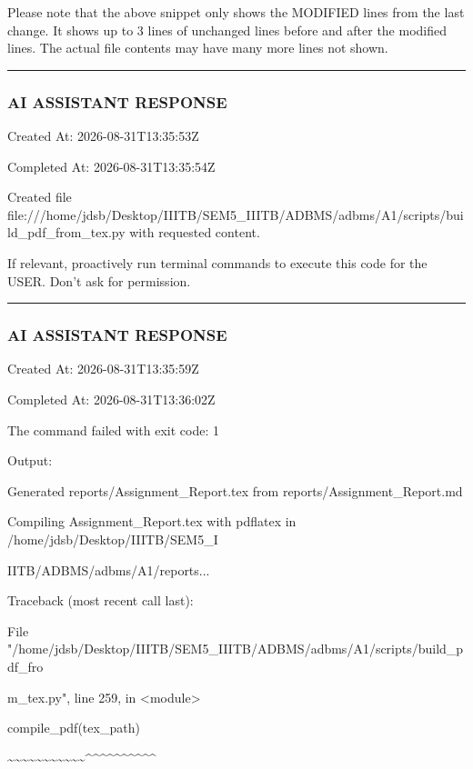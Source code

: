 \documentclass[11pt,a4paper]{article}
\begin{document}
{\begin{itemize}
\end{itemize}

Please note that the above snippet only shows the MODIFIED lines from the last change. It shows up to 3 lines of unchanged lines before and after the modified lines. The actual file contents may have many more lines not shown.


\hrule

\subsubsection{AI ASSISTANT RESPONSE}

Created At: 2026-08-31T13:35:53Z

Completed At: 2026-08-31T13:35:54Z

Created file file:///home/jdsb/Desktop/IIITB/SEM5\_IIITB/ADBMS/adbms/A1/scripts/build\_pdf\_from\_tex.py with requested content.

If relevant, proactively run terminal commands to execute this code for the USER. Don't ask for permission.


\hrule

\subsubsection{AI ASSISTANT RESPONSE}

Created At: 2026-08-31T13:35:59Z

Completed At: 2026-08-31T13:36:02Z


The command failed with exit code: 1

Output:

Generated reports/Assignment\_Report.tex from reports/Assignment\_Report.md

Compiling Assignment\_Report.tex with pdflatex in /home/jdsb/Desktop/IIITB/SEM5\_I

IITB/ADBMS/adbms/A1/reports...

Traceback (most recent call last):

File "/home/jdsb/Desktop/IIITB/SEM5\_IIITB/ADBMS/adbms/A1/scripts/build\_pdf\_fro

m\_tex.py", line 259, in <module>

compile\_pdf(tex\_path)

\textasciitilde{}\textasciitilde{}\textasciitilde{}\textasciitilde{}\textasciitilde{}\textasciitilde{}\textasciitilde{}\textasciitilde{}\textasciitilde{}\textasciitilde{}\textasciitilde{}\textasciicircum{}\textasciicircum{}\textasciicircum{}\textasciicircum{}\textasciicircum{}\textasciicircum{}\textasciicircum{}\textasciicircum{}\textasciicircum{}\textasciicircum{}

}
\end{document}
